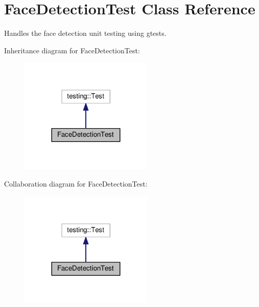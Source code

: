 \hypertarget{classFaceDetectionTest}{\section{Face\-Detection\-Test Class Reference}
\label{classFaceDetectionTest}
}


Handles the face detection unit testing using gtests.  




Inheritance diagram for Face\-Detection\-Test\-:
\nopagebreak
\begin{figure}[H]
\begin{center}
\leavevmode
\includegraphics[width=180pt]{classFaceDetectionTest__inherit__graph}
\end{center}
\end{figure}


Collaboration diagram for Face\-Detection\-Test\-:
\nopagebreak
\begin{figure}[H]
\begin{center}
\leavevmode
\includegraphics[width=180pt]{classFaceDetectionTest__coll__graph}
\end{center}
\end{figure}
